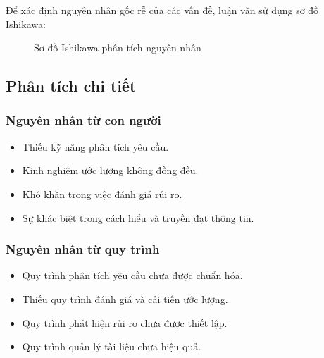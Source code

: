 \documentclass[12pt,a4paper]{report}
\begin{document}
Để xác định nguyên nhân gốc rễ của các vấn đề, luận văn sử dụng sơ đồ Ishikawa:

\begin{figure}[H]
\centering
{}
\caption{Sơ đồ Ishikawa phân tích nguyên nhân}
\label{fig:ishikawa}
\end{figure}

\subsection{Phân tích chi tiết}

\subsubsection{Nguyên nhân từ con người}

\begin{itemize}
\item Thiếu kỹ năng phân tích yêu cầu.
\item Kinh nghiệm ước lượng không đồng đều.
\item Khó khăn trong việc đánh giá rủi ro.
\item Sự khác biệt trong cách hiểu và truyền đạt thông tin.
\end{itemize}

\subsubsection{Nguyên nhân từ quy trình}

\begin{itemize}
\item Quy trình phân tích yêu cầu chưa được chuẩn hóa.
\item Thiếu quy trình đánh giá và cải tiến ước lượng.
\item Quy trình phát hiện rủi ro chưa được thiết lập.
\item Quy trình quản lý tài liệu chưa hiệu quả.
\end{itemize}
\end{document}

